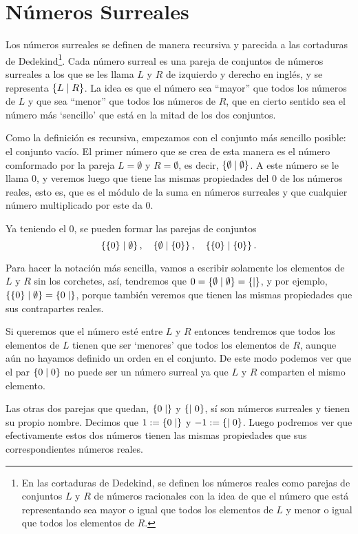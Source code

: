 \chapter{Números Surreales}

    Los números surreales se definen de manera recursiva y parecida a las cortaduras de Dedekind\footnote{En las cortaduras de Dedekind, se definen los n\'umeros reales como parejas de conjuntos $L$ y $R$ de n\'umeros racionales con la idea de que el n\'umero que est\'a representando sea mayor o igual que todos los elementos de $L$ y menor o igual que todos los elementos de $R$.}. Cada n\'umero surreal es una pareja de conjuntos de n\'umeros surreales a los que se les llama $L$ y $R$ de izquierdo y derecho en ingl\'es, y se representa $\left\{L\mid R\right\}$. La idea es que el n\'umero sea ``mayor'' que todos los n\'umeros de $L$ y que sea ``menor'' que todos los n\'umeros de $R$, que en cierto sentido sea el n\'umero m\'as `sencillo' que est\'a en la mitad de los dos conjuntos.

    Como la definici\'on es recursiva, empezamos con el conjunto m\'as sencillo posible: el conjunto vac\'io. El primer n\'umero que se crea de esta manera es el n\'umero comformado por la pareja $L = \emptyset$ y $R=\emptyset$, es decir, $\left\{\emptyset\mid \emptyset\right\}$. A este n\'umero se le llama $0$, y veremos luego que tiene las mismas propiedades del $0$ de los n\'umeros reales, esto es, que es el m\'odulo de la suma en n\'umeros surreales y que cualquier n\'umero multiplicado por este da $0$.

    Ya teniendo el $0$, se pueden formar las parejas de conjuntos
    \[
        \left\{\{0\}\mid \emptyset\right\}, \quad \left\{\emptyset\mid \{0\}\right\}, \quad \left\{\{0\}\mid \{0\}\right\}.
    \]
    
    Para hacer la notaci\'on m\'as sencilla, vamos a escribir solamente los elementos de $L$ y $R$ sin los corchetes, as\'i, tendremos que $0=\left\{\emptyset\mid \emptyset\right\} = \left\{\mid \right\}$, y por ejemplo, $\left\{\{0\}\mid \emptyset\right\} = \left\{0\mid \right\}$, porque tambi\'en veremos que tienen las mismas propiedades que sus contrapartes reales.

    Si queremos que el n\'umero est\'e entre $L$ y $R$ entonces tendremos que todos los elementos de $L$ tienen que ser `menores' que todos los elementos de $R$, aunque a\'un no hayamos definido un orden en el conjunto. De este modo podemos ver que el par $\left\{0\mid 0\right\}$ no puede ser un n\'umero surreal ya que $L$ y $R$ comparten el mismo elemento.

    Las otras dos parejas que quedan, $\left\{0\mid \right\}$ y $\left\{\mid 0\right\}$, s\'i son n\'umeros surreales y tienen su propio nombre. Decimos que $1 :=\left\{0\mid \right\}$ y $-1 :=\left\{\mid 0\right\}$. Luego podremos ver que efectivamente estos dos n\'umeros tienen las mismas propiedades que sus correspondientes n\'umeros reales.

